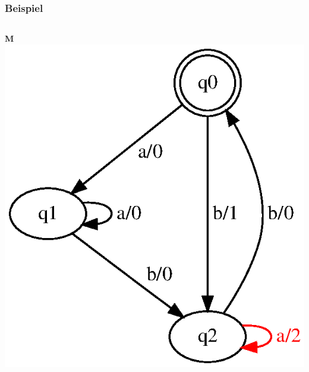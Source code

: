 \begin{frame}
\frametitle{Beispiel}
\begin{columns}[T] %

\begin{column}{.50\textwidth}
\textbf{M}
\includegraphics[width=\textwidth]{images/fsm-example01}
\end{column}%


\end{columns}
\end{frame}
